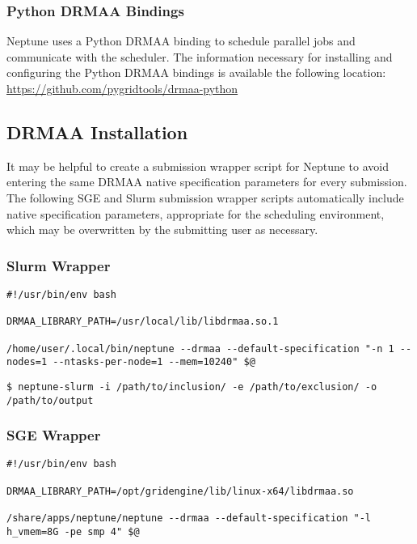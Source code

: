 \documentclass[a4paper,10pt]{article}
\begin{document}
\subsubsection{Python DRMAA Bindings}

Neptune uses a Python DRMAA binding to schedule parallel jobs and communicate with the scheduler. The information necessary for installing and configuring the Python DRMAA bindings is available the following location:
\newline\newline
\url{https://github.com/pygridtools/drmaa-python}

\subsection{DRMAA Installation}

It may be helpful to create a submission wrapper script for Neptune to avoid entering the same DRMAA native specification parameters for every submission. The following SGE and Slurm submission wrapper scripts automatically include native specification parameters, appropriate for the scheduling environment, which may be overwritten by the submitting user as necessary.

\subsubsection{Slurm Wrapper}

\begin{lstlisting}[title={neptune-slurm}]
#!/usr/bin/env bash

DRMAA_LIBRARY_PATH=/usr/local/lib/libdrmaa.so.1

/home/user/.local/bin/neptune --drmaa --default-specification "-n 1 --nodes=1 --ntasks-per-node=1 --mem=10240" $@
\end{lstlisting}

\begin{lstlisting}[title={Slurm Example}]
$ neptune-slurm -i /path/to/inclusion/ -e /path/to/exclusion/ -o /path/to/output
\end{lstlisting}

\subsubsection{SGE Wrapper}

\begin{lstlisting}[title={neptune-sge}]
#!/usr/bin/env bash

DRMAA_LIBRARY_PATH=/opt/gridengine/lib/linux-x64/libdrmaa.so

/share/apps/neptune/neptune --drmaa --default-specification "-l h_vmem=8G -pe smp 4" $@
\end{lstlisting}
\end{document}
